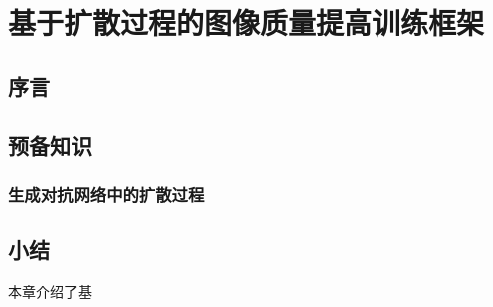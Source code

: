 \chapter{基于扩散过程的图像质量提高训练框架}
\label{chapter4}
\section{序言}


\section{预备知识}
\subsection{生成对抗网络中的扩散过程}

\section{小结}
本章介绍了基